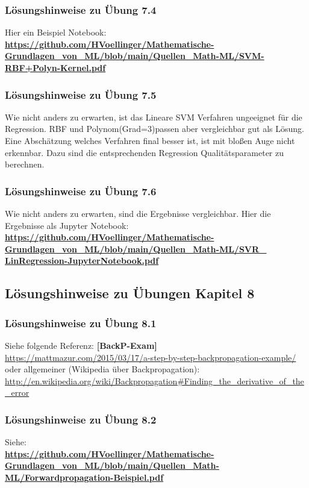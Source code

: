\documentclass[12pt]{article}
\begin{document}
\subsubsection{Lösungshinweise zu Übung 7.4}
Hier ein Beispiel Notebook:\\[0.2cm]
%
\textbf{\url{https://github.com/HVoellinger/Mathematische-Grundlagen_von_ML/blob/main/Quellen_Math-ML/SVM-RBF+Polyn-Kernel.pdf}} 
%
\subsubsection{Lösungshinweise zu Übung 7.5}
Wie nicht anders zu erwarten, ist das Lineare SVM Verfahren ungeeignet für die Regression. RBF und Polynom(Grad=3)passen aber vergleichbar gut als Lösung. Eine Abschätzung welches Verfahren final besser ist, ist mit bloßen Auge nicht erkennbar. Dazu sind die entsprechenden Regression Qualitätsparameter zu berechnen.\\[0.2cm]
%
\subsubsection{Lösungshinweise zu Übung 7.6}
Wie nicht anders zu erwarten, sind die Ergebnisse vergleichbar.
Hier die Ergebnisse als Jupyter Notebook:\\[0.2cm]
%
\textbf{\url{https://github.com/HVoellinger/Mathematische-Grundlagen_von_ML/blob/main/Quellen_Math-ML/SVR_ LinRegression-JupyterNotebook.pdf}} 
%
\newpage

\subsection{Lösungshinweise zu Übungen Kapitel 8}

\subsubsection{Lösungshinweise zu Übung 8.1}
%
Siehe folgende Referenz: \textbf{[BackP-Exam]}\\
\url{https://mattmazur.com/2015/03/17/a-step-by-step-backpropagation-example/} 
oder allgemeiner (Wikipedia über Backpropagation):\\
\url{http://en.wikipedia.org/wiki/Backpropagation#Finding_the_derivative_of_the_error}

\subsubsection{Lösungshinweise zu Übung 8.2}
Siehe:\\
\textbf{\url{https://github.com/HVoellinger/Mathematische-Grundlagen_von_ML/blob/main/Quellen_Math-ML/Forwardpropagation-Beispiel.pdf}}
\end{document}
